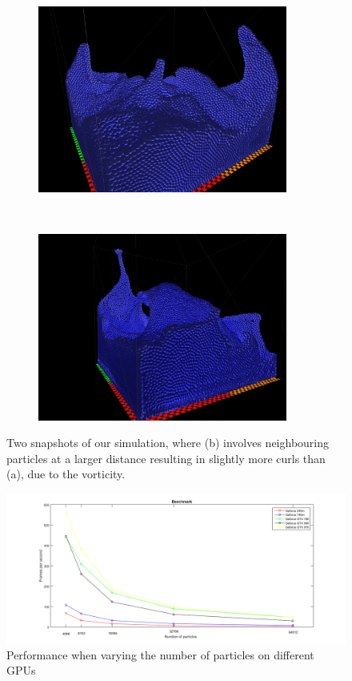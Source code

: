 \begin{figure}[H]
\centering
\begin{subfigure}{.9\textwidth}
  \centering
  \includegraphics[width=0.9\textwidth]{img/55296_edit.png}
  \caption{}
\end{subfigure}%
\\
\begin{subfigure}{.9\textwidth}
  \centering
  \includegraphics[width=0.9\textwidth]{img/3Nieghbours_55size.png}
  \caption{}
\end{subfigure}%

\caption{Two snapshots of our simulation, where (b) involves neighbouring particles at a larger distance resulting in slightly more curls than (a), due to the vorticity.}
\label{fig:result}
\end{figure}

\begin{figure}[H]
\hspace*{-2.1cm}
  \label{fig:graph}
  \centering
  \includegraphics[scale=0.5]{img/graph.png}
  \caption{Performance when varying the number of particles on different GPUs}
\end{figure}


